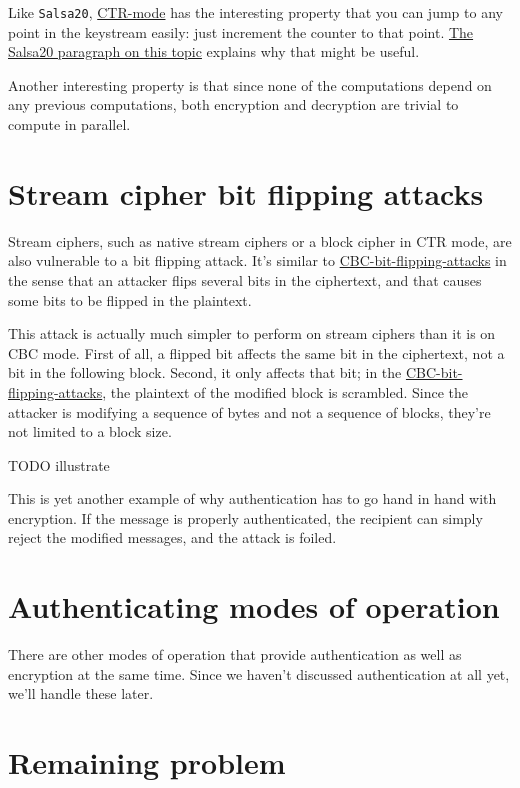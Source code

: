 \documentclass[11pt,ebook,table,dvipsnames]{memoir}
\begin{document}
Like \texttt{Salsa20}, \hyperref[CTR mode]{CTR-mode} has the interesting property that you can jump
to any point in the keystream easily: just increment the counter to
that point. \hyperref[keystream-jump]{The Salsa20 paragraph on this topic} explains why that
might be useful.

Another interesting property is that since none of the computations
depend on any previous computations, both encryption and decryption
are trivial to compute in parallel.
\section{Stream cipher bit flipping attacks}
\label{sec-2-3-15}

Stream ciphers, such as native stream ciphers or a block cipher in
\gls{CTR mode}, are also vulnerable to a bit flipping attack. It's
similar to \hyperref[CBC bit flipping attacks]{CBC-bit-flipping-attacks} in the sense that an attacker
flips several bits in the ciphertext, and that causes some bits to be
flipped in the plaintext.

This attack is actually much simpler to perform on stream ciphers than
it is on \gls{CBC mode}. First of all, a flipped bit affects the
same bit in the ciphertext, not a bit in the following block. Second, it
only affects that bit; in the \hyperref[CBC bit flipping attacks]{CBC-bit-flipping-attacks}, the plaintext
of the modified block is scrambled. Since the attacker is modifying a
sequence of bytes and not a sequence of blocks, they're not limited to
a block size.

TODO illustrate

This is yet another example of why authentication has to go hand in
hand with encryption. If the message is properly authenticated, the
recipient can simply reject the modified messages, and the attack is
foiled.
\section{Authenticating modes of operation}
\label{sec-2-3-16}

There are other modes of operation that provide authentication as
well as encryption at the same time. Since we haven't discussed
authentication at all yet, we'll handle these later.
\section{Remaining problem}
\label{sec-2-3-17}
\end{document}
